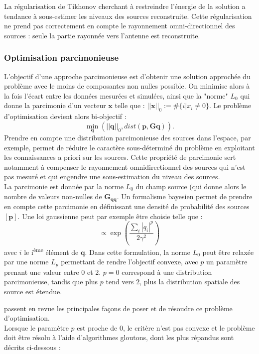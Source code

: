 La régularisation de Tikhonov cherchant à restreindre l'énergie de la solution a tendance à sous-estimer les niveaux des sources reconstruite. Cette régularisation ne prend pas correctement en compte le rayonnement omni-directionnel des sources : seule la partie rayonnée vers l'antenne est reconstruite. 

\subsubsection{Optimisation parcimonieuse }
L'objectif d'une approche parcimonieuse est d'obtenir une solution approchée du problème avec le moins de composantes non nulles possible. On minimise alors à la fois l'écart entre les données mesurées et simulées, ainsi que la "norme" $L_0$ qui donne la parcimonie d'un vecteur $\bm{x}$ telle que : $||\bm{x}||_0 := \#\{i|x_i\neq0\}$. Le problème d'optimisation devient alors bi-objectif : 
\begin{equation}
	\min_{\bm{q}}(||\bm{q}||_0 , dist(\bm{p},\bm{G}\bm{q})) .
	\label{bi-objectif}
\end{equation}
Prendre en compte une distribution parcimonieuse des sources dans l'espace, par exemple, permet de réduire le caractère sous-déterminé du problème en exploitant les connaissances a priori sur les sources. Cette propriété de parcimonie sert notamment à compenser le rayonnement omnidirectionnel des sources qui n'est pas mesuré et qui engendre une sous-estimation du niveau des sources. \\
La parcimonie est donnée par la norme $L_0$ du champ source (qui donne alors le nombre de valeurs non-nulles de $\bm{G_{qq}}$. Un formalisme bayesien permet de prendre en compte cette parcimonie en définissant une densité de probabilité des sources $[\bm{p}]$. Une loi gaussienne peut par exemple être choisie telle que : 
\begin{equation}
 [\bm{p}] \propto \exp\left(\frac{\sum_i |q_i|^p}{2\gamma^2}\right)
\end{equation}
avec $i$ le i\textsuperscript{ème} élément de $\bm{q}$. Dans cette formulation, la norme $L_0$ peut être relaxée par une norme $L_p$ permettant de rendre l'objectif convexe, avec $p$ un paramètre prenant une valeur entre $0$ et $2$. $p=0$ correspond à une distribution parcimonieuse, tandis que plus $p$ tend vers $2$, plus la distribution spatiale des source est étendue.

\cite{Tropp2010} passent en revue les principales façons de poser et de résoudre ce problème d'optimisation.\\
Lorsque le paramètre $p$ est proche de 0, le critère n'est pas convexe et le problème doit être résolu à l'aide d'algorithmes gloutons, dont les plus répandus sont décrits ci-dessous : 
